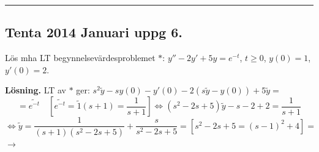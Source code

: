 \noindent\rule{\linewidth}{0.4pt}

\subsection{Tenta 2014 Januari uppg 6.}
Lös mha LT begynnelsevärdesproblemet \quad $*$: $y'' - 2y' + 5y = e^{-t}$, $t \ge 0$, $y(0) = 1$, $y'(0) = 2$.

\textbf{Lösning.} LT av $*$ ger: $s^2\tilde{y} - sy(0) - y'(0) - 2(s\tilde{y} - y(0)) + 5\tilde{y} =$
\[ = \widetilde{e^{-t}} \quad \left[ \widetilde{e^{-t}} = \tilde{1}(s + 1) = \frac{1}{s + 1} \right] \Leftrightarrow (s^2 - 2s + 5)\tilde{y} - s - 2 + 2 = \frac{1}{s + 1} \]
\[ \Leftrightarrow \tilde{y} = \frac{1}{(s + 1)(s^2 - 2s + 5)} + \frac{s}{s^2 - 2s + 5} = \left[ s^2 - 2s + 5 = (s - 1)^2 + 4 \right] = \]
\hfill $\longrightarrow$
